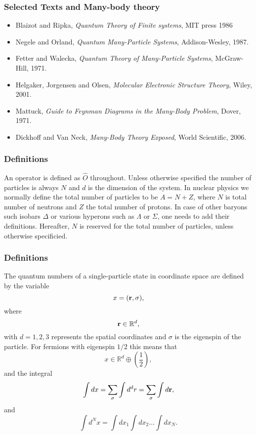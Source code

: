 \documentclass{beamer}
\begin{document}
\begin{frame}
\frametitle{Selected Texts and Many-body theory}

\begin{block}{}
\begin{itemize}
\item Blaizot and Ripka, \emph{Quantum Theory of Finite systems}, MIT press 1986

\item Negele and Orland, \emph{Quantum Many-Particle Systems}, Addison-Wesley, 1987.

\item Fetter and Walecka, \emph{Quantum Theory of Many-Particle Systems}, McGraw-Hill, 1971.

\item Helgaker, Jorgensen and Olsen, \emph{Molecular Electronic Structure Theory}, Wiley, 2001.

\item Mattuck, \emph{Guide to Feynman Diagrams in the Many-Body Problem}, Dover, 1971.

\item Dickhoff and Van Neck, \emph{Many-Body Theory Exposed}, World Scientific, 2006.
\end{itemize}

\noindent
\end{block}
\end{frame}

\begin{frame}
\frametitle{Definitions}

\begin{block}{}
An operator is defined as $\hat{O}$ throughout. Unless otherwise specified the number of particles is
always $N$ and $d$ is the dimension of the system.  In nuclear physics
we normally define the total number of particles to be $A=N+Z$, where
$N$ is total number of neutrons and $Z$ the total number of
protons. In case of other baryons such isobars $\Delta$ or various
hyperons such as $\Lambda$ or $\Sigma$, one needs to add their
definitions.  Hereafter, $N$ is reserved for the total number of
particles, unless otherwise specificied. 
\end{block}
\end{frame}

\begin{frame}
\frametitle{Definitions}

\begin{block}{}
The quantum numbers of a single-particle state in coordinate space are
defined by the variable 
\[
x=({\bf r},\sigma), 
\]
where 
\[
{\bf r}\in {\mathbb{R}}^{d},
\]
with $d=1,2,3$ represents the spatial coordinates and $\sigma$ is the eigenspin of the particle. For fermions with eigenspin $1/2$ this means that
\[
 x\in {\mathbb{R}}^{d}\oplus (\frac{1}{2}),
\]
and the integral
\[
\int dx = \sum_{\sigma}\int d^dr = \sum_{\sigma}\int d{\bf r},
\]
and
\[
\int d^Nx= \int dx_1\int dx_2\dots\int dx_N.
\]
\end{block}
\end{frame}
\end{document}
